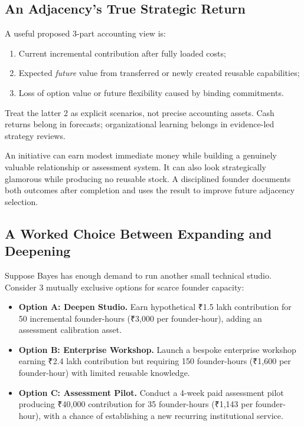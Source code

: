 \subsection{An Adjacency's True Strategic Return}
\label{sec:adjacencys_true_strategic_return}

A useful proposed 3-part accounting view is:
\begin{enumerate}
    \item Current incremental contribution after fully loaded costs;
    \item Expected \textit{future} value from transferred or newly created reusable capabilities;
    \item Loss of option value or future flexibility caused by binding commitments.
\end{enumerate}
Treat the latter 2 as explicit scenarios, not precise accounting assets. Cash returns belong in forecasts; organizational learning belongs in evidence-led strategy reviews.

An initiative can earn modest immediate money while building a genuinely valuable relationship or assessment system. It can also look strategically glamorous while producing no reusable stock. A disciplined founder documents both outcomes after completion and uses the result to improve future adjacency selection.

\subsection{A Worked Choice Between Expanding and Deepening}
\label{sec:worked_choice_expanding_vs_deepening}

Suppose Bayes has enough demand to run another small technical studio. Consider 3 mutually exclusive options for scarce founder capacity:
\begin{itemize}
    \item \textbf{Option A: Deepen Studio.} Earn hypothetical ₹1.5 lakh contribution for 50 incremental founder-hours (₹3,000 per founder-hour), adding an assessment calibration asset.
    \item \textbf{Option B: Enterprise Workshop.} Launch a bespoke enterprise workshop earning ₹2.4 lakh contribution but requiring 150 founder-hours (₹1,600 per founder-hour) with limited reusable knowledge.
    \item \textbf{Option C: Assessment Pilot.} Conduct a 4-week paid assessment pilot producing ₹40,000 contribution for 35 founder-hours (₹1,143 per founder-hour), with a chance of establishing a new recurring institutional service.
\end{itemize}

